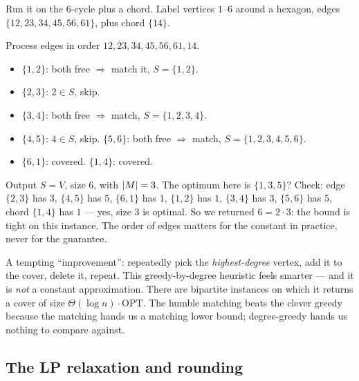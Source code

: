 \begin{labbox}
Run it on the 6-cycle plus a chord. Label vertices $1$--$6$ around a hexagon, edges
$\{12,23,34,45,56,61\}$, plus chord $\{14\}$.

\begin{center}
\end{center}

Process edges in order $12,23,34,45,56,61,14$.
\begin{itemize}
  \item $\{1,2\}$: both free $\Rightarrow$ match it, $S=\{1,2\}$.
  \item $\{2,3\}$: $2\in S$, skip.
  \item $\{3,4\}$: both free $\Rightarrow$ match, $S=\{1,2,3,4\}$.
  \item $\{4,5\}$: $4\in S$, skip. $\{5,6\}$: both free $\Rightarrow$ match, $S=\{1,2,3,4,5,6\}$.
  \item $\{6,1\}$: covered. $\{1,4\}$: covered.
\end{itemize}
Output $S=V$, size $6$, with $\lvert M\rvert=3$. The optimum here is $\{1,3,5\}$? Check: edge $\{2,3\}$ has
$3$, $\{4,5\}$ has $5$, $\{6,1\}$ has $1$, $\{1,2\}$ has $1$, $\{3,4\}$ has $3$, $\{5,6\}$ has $5$,
chord $\{1,4\}$ has $1$ --- yes, size $3$ is optimal. So we returned $6 = 2\cdot 3$: the bound is
tight on this instance. The order of edges matters for the constant in practice, never for the
guarantee.
\end{labbox}

\begin{trapbox}
A tempting ``improvement'': repeatedly pick the \emph{highest-degree} vertex, add it to the cover,
delete it, repeat. This greedy-by-degree heuristic feels smarter --- and it is \emph{not} a constant
approximation. There are bipartite instances on which it returns a cover of size
$\Theta(\log n)\cdot\mathrm{OPT}$. The humble matching beats the clever greedy because the matching
hands us a matching lower bound; degree-greedy hands us nothing to compare against.
\end{trapbox}

\subsection{The LP relaxation and rounding}

